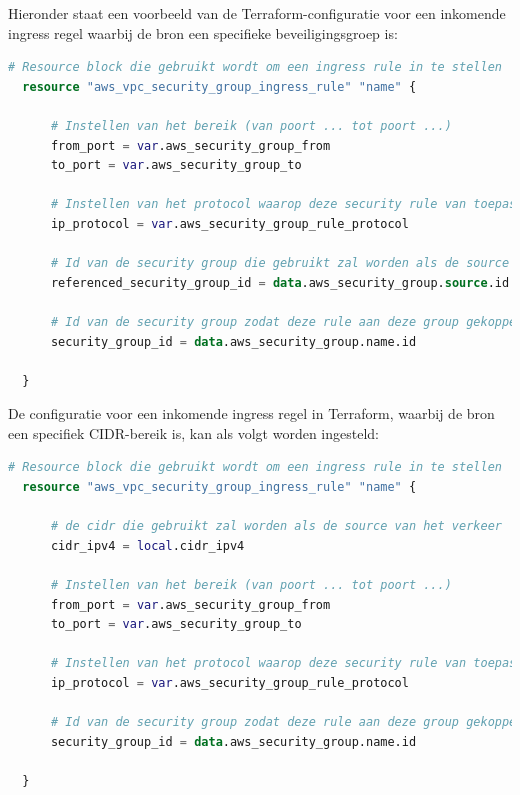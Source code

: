 Hieronder staat een voorbeeld van de Terraform-configuratie voor een inkomende ingress regel waarbij de bron een specifieke beveiligingsgroep is:
\newline

\begin{lstlisting}[language=terraform]
  # Resource block die gebruikt wordt om een ingress rule in te stellen
  resource "aws_vpc_security_group_ingress_rule" "name" {
  
      # Instellen van het bereik (van poort ... tot poort ...)
      from_port = var.aws_security_group_from
      to_port = var.aws_security_group_to
  
      # Instellen van het protocol waarop deze security rule van toepassing is tcp/udp of -1 voor beide
      ip_protocol = var.aws_security_group_rule_protocol
  
      # Id van de security group die gebruikt zal worden als de source van het verkeer
      referenced_security_group_id = data.aws_security_group.source.id
  
      # Id van de security group zodat deze rule aan deze group gekoppeld kan worden
      security_group_id = data.aws_security_group.name.id
    
  }
\end{lstlisting}

\vspace{0.5cm}
De configuratie voor een inkomende ingress regel in Terraform, waarbij de bron een specifiek CIDR-bereik is, kan als volgt worden ingesteld:
\newline

\begin{lstlisting}[language=terraform]
  # Resource block die gebruikt wordt om een ingress rule in te stellen
  resource "aws_vpc_security_group_ingress_rule" "name" {
  
      # de cidr die gebruikt zal worden als de source van het verkeer
      cidr_ipv4 = local.cidr_ipv4
  
      # Instellen van het bereik (van poort ... tot poort ...)
      from_port = var.aws_security_group_from
      to_port = var.aws_security_group_to
  
      # Instellen van het protocol waarop deze security rule van toepassing is tcp/udp of -1 voor beide
      ip_protocol = var.aws_security_group_rule_protocol
  
      # Id van de security group zodat deze rule aan deze group gekoppeld kan worden
      security_group_id = data.aws_security_group.name.id
    
  }
\end{lstlisting}

